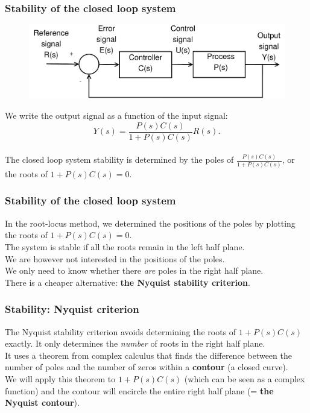 \begin{frame}
	\frametitle{Stability of the closed loop system}
	\begin{figure}
		\includegraphics[width=0.8\linewidth]{closedloop}
	\end{figure}
	We write the output signal as a function of the input signal: $$Y(s)=\frac{P(s)C(s)}{1+P(s)C(s)}R(s).$$\\
	The closed loop system stability is determined by the poles of $\frac{P(s)C(s)}{1+P(s)C(s)}$, or the roots of $1+P(s)C(s)=0$.
\end{frame}

\begin{frame}
	\frametitle{Stability of the closed loop system}
	\vspace{-8ex}
	In the root-locus method, we determined the positions of the poles by plotting the roots of $1+P(s)C(s)=0$.\\
	\medskip
	The system is stable if all the roots remain in the left half plane.\\
	\medskip
	We are however not interested in the positions of the poles.\\
	We only need to know whether there \textit{are} poles in the right half plane.\\
	\medskip
	There is a cheaper alternative: \textbf{the Nyquist stability criterion}.
\end{frame}

\begin{frame}
	\frametitle{Stability: Nyquist criterion}
	\vspace{-5ex}
	The Nyquist stability criterion avoids determining the roots of $1+P(s)C(s)$ exactly. It only determines the \textit{number} of roots in the right half plane.\\
	\medskip
	It uses a theorem from complex calculus that finds the difference between the number of poles and the number of zeros within a \textbf{contour} (a closed curve).\\
	\medskip
	We will apply this theorem to $1+P(s)C(s)$ (which can be seen as a complex function) and the contour will encircle the entire right half plane (= \textbf{the Nyquist contour}).
\end{frame}

